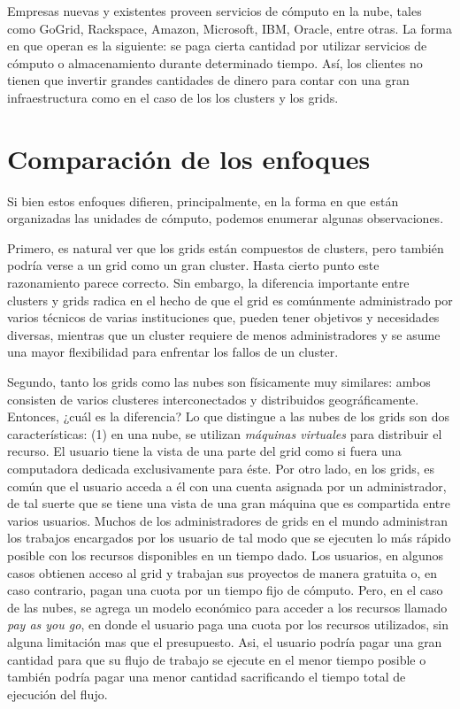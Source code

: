 \documentclass[letterpaper, 12pt]{report}
\begin{document}
Empresas nuevas y existentes proveen servicios de cómputo en la nube, tales como GoGrid, Rackspace, Amazon, Microsoft, IBM, Oracle, entre otras. La forma en que operan es la siguiente: se paga cierta cantidad por utilizar servicios de cómputo o almacenamiento durante determinado tiempo. Así, los clientes no tienen que invertir grandes cantidades de dinero para contar con una gran infraestructura como en el caso de los los clusters y los grids.

\section{Comparación de los enfoques}
Si bien estos enfoques difieren, principalmente, en la forma en que están organizadas las unidades de cómputo, podemos enumerar algunas observaciones.

Primero, es natural ver que los grids están compuestos de clusters, pero también podría verse a un grid como un gran cluster. Hasta cierto punto este razonamiento parece correcto. Sin embargo, la diferencia importante entre clusters y grids radica en el hecho de que el grid es comúnmente administrado por varios técnicos de varias instituciones que, pueden tener objetivos y necesidades diversas, mientras que un cluster requiere de menos administradores y se asume una mayor flexibilidad para enfrentar los fallos de un cluster.

Segundo, tanto los grids como las nubes son físicamente muy similares: ambos consisten de varios clusteres interconectados y distribuidos geográficamente. Entonces, ¿cuál es la diferencia? Lo que distingue a las nubes de los grids son dos características: (1) en una nube, se utilizan \emph{máquinas virtuales} para distribuir el recurso. El usuario tiene la vista de una parte del grid como si fuera una computadora dedicada exclusivamente para éste. Por otro lado, en los grids, es común que el usuario acceda a él con una cuenta asignada por un administrador, de tal suerte que se tiene una vista de una gran máquina que es compartida entre varios usuarios. Muchos de los administradores de grids en el mundo administran los trabajos encargados por los usuario de tal modo que se ejecuten lo más rápido posible con los recursos disponibles en un tiempo dado. Los usuarios, en algunos casos obtienen acceso al grid y trabajan sus proyectos de manera gratuita o, en caso contrario, pagan una cuota por un tiempo fijo de cómputo. Pero, en el caso de las nubes, se agrega un modelo económico para acceder a los recursos llamado \emph{pay as you go}, en donde el usuario paga una cuota por los recursos utilizados, sin alguna limitación mas que el presupuesto. Asi, el usuario podría pagar una gran cantidad para que su flujo de trabajo se ejecute en el menor tiempo posible o también podría pagar una menor cantidad sacrificando el tiempo total de ejecución del flujo.
\end{document}
